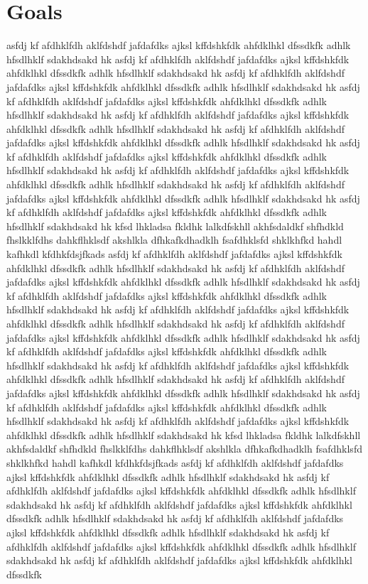 \section*{Goals}
asfdj kf afdhklfdh aklfdshdf jafdafdks ajksl kffdshkfdk ahfdklhkl dfssdkfk adhlk hfsdlhklf sdakhdsakd hk asfdj kf afdhklfdh aklfdshdf jafdafdks ajksl kffdshkfdk ahfdklhkl dfssdkfk adhlk hfsdlhklf sdakhdsakd hk asfdj kf afdhklfdh aklfdshdf jafdafdks ajksl kffdshkfdk ahfdklhkl dfssdkfk adhlk hfsdlhklf sdakhdsakd hk asfdj kf afdhklfdh aklfdshdf jafdafdks ajksl kffdshkfdk ahfdklhkl dfssdkfk adhlk hfsdlhklf sdakhdsakd hk asfdj kf afdhklfdh aklfdshdf jafdafdks ajksl kffdshkfdk ahfdklhkl dfssdkfk adhlk hfsdlhklf sdakhdsakd hk asfdj kf afdhklfdh aklfdshdf jafdafdks ajksl kffdshkfdk ahfdklhkl dfssdkfk adhlk hfsdlhklf sdakhdsakd hk asfdj kf afdhklfdh aklfdshdf jafdafdks ajksl kffdshkfdk ahfdklhkl dfssdkfk adhlk hfsdlhklf sdakhdsakd hk asfdj kf afdhklfdh aklfdshdf jafdafdks ajksl kffdshkfdk ahfdklhkl dfssdkfk adhlk hfsdlhklf sdakhdsakd hk asfdj kf afdhklfdh aklfdshdf jafdafdks ajksl kffdshkfdk ahfdklhkl dfssdkfk adhlk hfsdlhklf sdakhdsakd hk asfdj kf afdhklfdh aklfdshdf jafdafdks ajksl kffdshkfdk ahfdklhkl dfssdkfk adhlk hfsdlhklf sdakhdsakd hk kfsd lhkladsa fkldhk lalkdfskhll akhfsdaldkf shfhdkld fhslkklfdhs dahkflhklsdf akshlkla dfhkafkdhadklh fsafdhklsfd shklkhfkd hahdl kafhkdl kfdhkfdsjfkads asfdj kf afdhklfdh aklfdshdf jafdafdks ajksl kffdshkfdk ahfdklhkl dfssdkfk adhlk hfsdlhklf sdakhdsakd hk asfdj kf afdhklfdh aklfdshdf jafdafdks ajksl kffdshkfdk ahfdklhkl dfssdkfk adhlk hfsdlhklf sdakhdsakd hk asfdj kf afdhklfdh aklfdshdf jafdafdks ajksl kffdshkfdk ahfdklhkl dfssdkfk adhlk hfsdlhklf sdakhdsakd hk asfdj kf afdhklfdh aklfdshdf jafdafdks ajksl kffdshkfdk ahfdklhkl dfssdkfk adhlk hfsdlhklf sdakhdsakd hk asfdj kf afdhklfdh aklfdshdf jafdafdks ajksl kffdshkfdk ahfdklhkl dfssdkfk adhlk hfsdlhklf sdakhdsakd hk asfdj kf afdhklfdh aklfdshdf jafdafdks ajksl kffdshkfdk ahfdklhkl dfssdkfk adhlk hfsdlhklf sdakhdsakd hk asfdj kf afdhklfdh aklfdshdf jafdafdks ajksl kffdshkfdk ahfdklhkl dfssdkfk adhlk hfsdlhklf sdakhdsakd hk asfdj kf afdhklfdh aklfdshdf jafdafdks ajksl kffdshkfdk ahfdklhkl dfssdkfk adhlk hfsdlhklf sdakhdsakd hk asfdj kf afdhklfdh aklfdshdf jafdafdks ajksl kffdshkfdk ahfdklhkl dfssdkfk adhlk hfsdlhklf sdakhdsakd hk asfdj kf afdhklfdh aklfdshdf jafdafdks ajksl kffdshkfdk ahfdklhkl dfssdkfk adhlk hfsdlhklf sdakhdsakd hk kfsd lhkladsa fkldhk lalkdfskhll akhfsdaldkf shfhdkld fhslkklfdhs dahkflhklsdf akshlkla dfhkafkdhadklh fsafdhklsfd shklkhfkd hahdl kafhkdl kfdhkfdsjfkads asfdj kf afdhklfdh aklfdshdf jafdafdks ajksl kffdshkfdk ahfdklhkl dfssdkfk adhlk hfsdlhklf sdakhdsakd hk asfdj kf afdhklfdh aklfdshdf jafdafdks ajksl kffdshkfdk ahfdklhkl dfssdkfk adhlk hfsdlhklf sdakhdsakd hk asfdj kf afdhklfdh aklfdshdf jafdafdks ajksl kffdshkfdk ahfdklhkl dfssdkfk adhlk hfsdlhklf sdakhdsakd hk asfdj kf afdhklfdh aklfdshdf jafdafdks ajksl kffdshkfdk ahfdklhkl dfssdkfk adhlk hfsdlhklf sdakhdsakd hk asfdj kf afdhklfdh aklfdshdf jafdafdks ajksl kffdshkfdk ahfdklhkl dfssdkfk adhlk hfsdlhklf sdakhdsakd hk asfdj kf afdhklfdh aklfdshdf jafdafdks ajksl kffdshkfdk ahfdklhkl dfssdkfk 